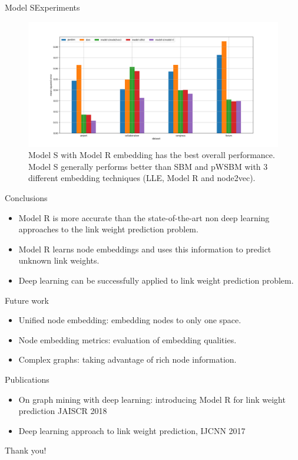 \documentclass{beamer}
\begin{document}
\begin{frame}{Model S}{Experiments}
	\begin{figure}[ht] \centering
		\includegraphics[width=1\linewidth]{weight-errors}
		\caption{
			Model S with Model R embedding has the best overall performance. Model S generally performs better than SBM and pWSBM with 3 different embedding techniques (LLE, Model R and node2vec).
		}
		\label{fig:weight-errors}
	\end{figure}
\end{frame}

\begin{frame}{Conclusions}
	\begin{itemize}
		\item Model R is more accurate than the state-of-the-art non deep learning approaches to the link weight prediction problem.
		\item Model R learns node embeddings and uses this information to predict unknown link weights.
		\item Deep learning can be successfully applied to link weight prediction problem.
	\end{itemize}
\end{frame}

\begin{frame}{Future work}
	\begin{itemize}
		\item Unified node embedding: embedding nodes to only one space.
		\item Node embedding metrics: evaluation of embedding qualities.
		\item Complex graphs: taking advantage of rich node information.
	\end{itemize}
\end{frame}

\begin{frame}{Publications}
	\begin{itemize}
		\item On graph mining with deep learning: introducing Model R for link weight prediction JAISCR 2018
		\item Deep learning approach to link weight prediction, IJCNN 2017
	\end{itemize}
\end{frame}

\begin{frame}
	\begin{center}
		\Huge Thank you!
	\end{center}
\end{frame}
\end{document}
